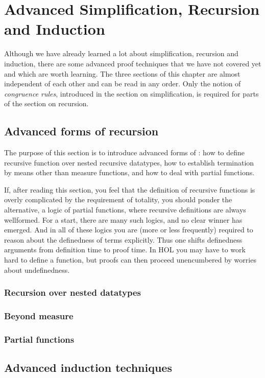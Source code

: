 \chapter{Advanced Simplification, Recursion and Induction}

Although we have already learned a lot about simplification, recursion and
induction, there are some advanced proof techniques that we have not covered
yet and which are worth learning. The three sections of this chapter are almost
independent of each other and can be read in any order. Only the notion of
\emph{congruence rules}, introduced in the section on simplification, is
required for parts of the section on recursion.



\section{Advanced forms of recursion}

The purpose of this section is to introduce advanced forms of
: how to define recursive function over nested recursive
datatypes, how to establish termination by means other than measure functions,
and how to deal with partial functions.

If, after reading this section, you feel that the definition of recursive
functions is overly complicated by the requirement of
totality, you should ponder the alternative, a logic of partial functions,
where recursive definitions are always wellformed. For a start, there are many
such logics, and no clear winner has emerged. And in all of these logics you
are (more or less frequently) required to reason about the definedness of
terms explicitly. Thus one shifts definedness arguments from definition time to
proof time. In HOL you may have to work hard to define a function, but proofs
can then proceed unencumbered by worries about undefinedness.

\subsection{Recursion over nested datatypes}
\label{sec:nested-recdef}




\subsection{Beyond measure}
\label{sec:beyond-measure}


\subsection{Partial functions}



\section{Advanced induction techniques}
\label{sec:advanced-ind}


